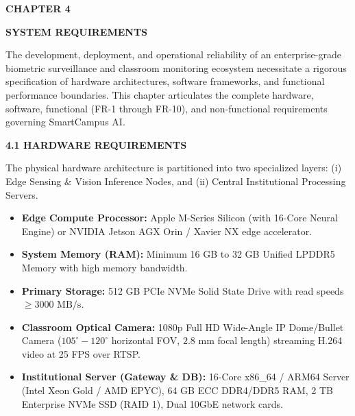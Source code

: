 \newpage
\begin{flushleft}
{\fontsize{16pt}{16pt}\selectfont \textbf{CHAPTER 4}}
\end{flushleft}		
\begin{center}
{\fontsize{18pt}{22pt}\selectfont \textbf{SYSTEM REQUIREMENTS}}\\[2mm]
\end{center}

\onehalfspacing
\justifying
\noindent The development, deployment, and operational reliability of an enterprise-grade biometric surveillance and classroom monitoring ecosystem necessitate a rigorous specification of hardware architectures, software frameworks, and functional performance boundaries. This chapter articulates the complete hardware, software, functional (FR-1 through FR-10), and non-functional requirements governing SmartCampus AI.

\vspace{0.2in}
\begin{flushleft}
{\fontsize{14pt}{18pt}\selectfont \textbf{4.1 HARDWARE REQUIREMENTS}}\\[2mm]
\end{flushleft}

\noindent The physical hardware architecture is partitioned into two specialized layers: (i) Edge Sensing & Vision Inference Nodes, and (ii) Central Institutional Processing Servers.
\begin{itemize}
    \item \textbf{Edge Compute Processor:} Apple M-Series Silicon (with 16-Core Neural Engine) or NVIDIA Jetson AGX Orin / Xavier NX edge accelerator.
    \item \textbf{System Memory (RAM):} Minimum 16 GB to 32 GB Unified LPDDR5 Memory with high memory bandwidth.
    \item \textbf{Primary Storage:} 512 GB PCIe NVMe Solid State Drive with read speeds $\ge 3000\text{ MB/s}$.
    \item \textbf{Classroom Optical Camera:} 1080p Full HD Wide-Angle IP Dome/Bullet Camera ($105^\circ - 120^\circ$ horizontal FOV, $2.8\text{ mm}$ focal length) streaming H.264 video at 25 FPS over RTSP.
    \item \textbf{Institutional Server (Gateway \& DB):} 16-Core x86\_64 / ARM64 Server (Intel Xeon Gold / AMD EPYC), 64 GB ECC DDR4/DDR5 RAM, 2 TB Enterprise NVMe SSD (RAID 1), Dual 10GbE network cards.
\end{itemize}

